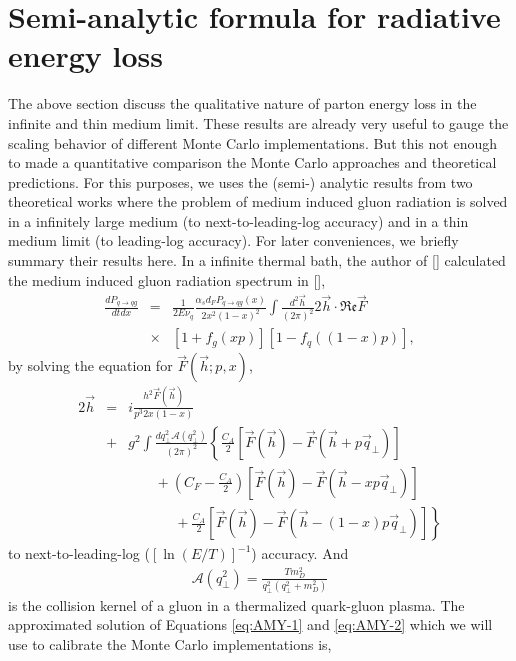 \documentclass[aps, prc, reprint, amsmath, groupedaddress, nofootinbib]{revtex4-1}
\begin{document}
\section{Semi-analytic formula for radiative energy loss}
The above section discuss the qualitative nature of parton energy loss in the infinite and thin medium limit. These results are already very useful to gauge the scaling behavior of different Monte Carlo implementations.
But this not enough to made a quantitative comparison the Monte Carlo approaches and theoretical predictions.
For this purposes, we uses the (semi-) analytic results from two theoretical works where the problem of medium induced gluon radiation is solved in a infinitely large medium (to next-to-leading-log accuracy) and in a thin medium limit (to leading-log accuracy).
For later conveniences, we briefly summary their results here.
In a infinite thermal bath, the author of [] calculated the medium induced gluon radiation spectrum in [],
\begin{eqnarray}\label{eq:AMY-1}
\nonumber
\frac{dP_{q\rightarrow qg}}{dt dx} &=& \frac{1}{2E\nu_q} \frac{\alpha_s d_F P_{q\rightarrow qg}(x)}{2x^2(1-x)^2}\int\frac{d^2\vec{h}}{(2\pi)^2}2\vec{h}\cdot \mathfrak{Re} \vec{F} \\
&\times& [1+f_g(xp)][1-f_q((1-x)p)],
\end{eqnarray}
by solving the equation for $\vec{F}(\vec{h}; p, x)$,
\begin{eqnarray}\label{eq:AMY-2}
\nonumber
2\vec{h} &=& i\frac{h^2 \vec{F}(\vec{h})}{p^3 2x(1-x)} \\
\nonumber
&+& g^2\int \frac{dq_\perp^2 \mathcal{A}(q_\perp^2)}{(2\pi)^2}\left\{\frac{C_A}{2}\left[\vec{F}(\vec{h}) - \vec{F}(\vec{h}+p\vec{q}_\perp)\right]\right. \\
\nonumber
&& \phantom{ssss} + \left(C_F - \frac{C_A}{2}\right)\left[\vec{F}(\vec{h}) - \vec{F}(\vec{h}-xp\vec{q}_\perp)\right] \\
&& \phantom{sssssss} + \left. \frac{C_A}{2}\left[\vec{F}(\vec{h}) - \vec{F}(\vec{h}-(1-x)p\vec{q}_\perp)\right] \right\}
\end{eqnarray}
to next-to-leading-log ($[\ln(E/T)]^{-1}$) accuracy.
And
\begin{eqnarray}
\mathcal{A}(q_\perp^2) = \frac{T m_D^2}{q_\perp^2(q_\perp^2+m_D^2)}
\end{eqnarray}
is the collision kernel of a gluon in a thermalized quark-gluon plasma.
The approximated solution of Equations \ref{eq:AMY-1} and \ref{eq:AMY-2} which we will use to calibrate the Monte Carlo implementations is,
\end{document}
